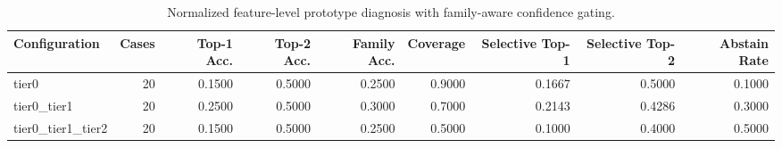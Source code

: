 \begin{table}[t]
\centering
\caption{Normalized feature-level prototype diagnosis with family-aware confidence gating.}
\label{tab:dice_stressor_hierarchical_diagnosis}
\footnotesize
\begin{tabular}{lrrrrrrrr}
\toprule
Configuration & Cases & Top-1 Acc. & Top-2 Acc. & Family Acc. & Coverage & Selective Top-1 & Selective Top-2 & Abstain Rate \\
\midrule
tier0 & 20 & 0.1500 & 0.5000 & 0.2500 & 0.9000 & 0.1667 & 0.5000 & 0.1000 \\
tier0_tier1 & 20 & 0.2500 & 0.5000 & 0.3000 & 0.7000 & 0.2143 & 0.4286 & 0.3000 \\
tier0_tier1_tier2 & 20 & 0.1500 & 0.5000 & 0.2500 & 0.5000 & 0.1000 & 0.4000 & 0.5000 \\
\bottomrule
\end{tabular}

\end{table}
